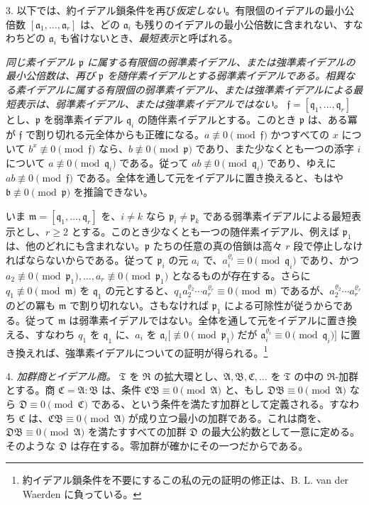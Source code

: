 \documentclass[11pt]{article}
\providecommand{\mR}{\mathfrak{R}}
\providecommand{\mT}{\mathfrak{T}}
\providecommand{\mA}{\mathfrak{A}}
\providecommand{\mB}{\mathfrak{B}}
\providecommand{\mC}{\mathfrak{C}}
\providecommand{\mD}{\mathfrak{D}}
\providecommand{\ma}{\mathfrak{a}}
\providecommand{\mb}{\mathfrak{b}}
\providecommand{\mf}{\mathfrak{f}}
\providecommand{\mm}{\mathfrak{m}}
\providecommand{\mpideal}{\mathfrak{p}}
\providecommand{\mq}{\mathfrak{q}}
\begin{document}
3. 以下では、約イデアル鎖条件を再び\emph{仮定しない}。有限個のイデアルの最小公倍数 $[\ma_1,\ldots,\ma_r]$ は、どの $\ma_i$ も残りのイデアルの最小公倍数に含まれない、すなわちどの $\ma_i$ も省けないとき、\emph{最短表示}と呼ばれる。

\emph{同じ素イデアル $\mpideal$ に属する有限個の弱準素イデアル、または強準素イデアルの最小公倍数は、再び $\mpideal$ を随伴素イデアルとする弱準素イデアルである。相異なる素イデアルに属する有限個の弱準素イデアル、または強準素イデアルによる最短表示は、弱準素イデアル、または強準素イデアルではない。} $\mf=[\mq_1,\ldots,\mq_r]$ とし、$\mpideal$ を弱準素イデアル $\mq_i$ の随伴素イデアルとする。このとき $\mpideal$ は、ある冪が $\mf$ で割り切れる元全体からも正確になる。$a\not\equiv0\pmod{\mf}$ かつすべての $x$ について $b^x\not\equiv0\pmod{\mf}$ なら、$b\not\equiv0\pmod{\mpideal}$ であり、また少なくとも一つの添字 $i$ について $a\not\equiv0\pmod{\mq_i}$ である。従って $ab\not\equiv0\pmod{\mq_i}$ であり、ゆえに $ab\not\equiv0\pmod{\mf}$ である。全体を通して元をイデアルに置き換えると、もはや $\mb\not\equiv0\pmod{\mpideal}$ を推論できない。

いま $\mm=[\mq_1,\ldots,\mq_r]$ を、$i\ne k$ なら $\mpideal_i\ne\mpideal_k$ である弱準素イデアルによる最短表示とし、$r\ge2$ とする。このとき少なくとも一つの随伴素イデアル、例えば $\mpideal_1$ は、他のどれにも含まれない。$\mpideal$ たちの任意の真の倍鎖は高々 $r$ 段で停止しなければならないからである。従って $\mpideal_i$ の元 $a_i$ で、$a_i^{\varrho_i}\equiv0\pmod{\mq_i}$ であり、かつ $a_2\not\equiv0\pmod{\mpideal_1},\ldots,a_r\not\equiv0\pmod{\mpideal_1}$ となるものが存在する。さらに $q_1\not\equiv0\pmod{\mm}$ を $\mq_1$ の元とすると、$q_1a_2^{\varrho_2}\cdots a_r^{\varrho_r}\equiv0\pmod{\mm}$ であるが、$a_2^{\varrho_2}\cdots a_r^{\varrho_r}$ のどの冪も $\mm$ で割り切れない。さもなければ $\mpideal_1$ による可除性が従うからである。従って $\mm$ は弱準素イデアルではない。全体を通して元をイデアルに置き換える、すなわち $q_1$ を $\mq_1$ に、$a_i$ を $\ma_i[\not\equiv0\pmod{\mpideal_1}$ だが $\ma_i^{\varrho_i}\equiv0\pmod{\mq_i}]$ に置き換えれば、強準素イデアルについての証明が得られる。\footnote{約イデアル鎖条件を不要にするこの私の元の証明の修正は、B. L. van der Waerden に負っている。}

4. \emph{加群商とイデアル商。} $\mT$ を $\mR$ の拡大環とし、$\mA,\mB,\mC,\ldots$ を $\mT$ の中の $\mR$-加群とする。商 $\mC=\mA:\mB$ は、条件 $\mC\mB\equiv0\pmod{\mA}$ と、もし $\mD\mB\equiv0\pmod{\mA}$ なら $\mD\equiv0\pmod{\mC}$ である、という条件を満たす加群として定義される。すなわち $\mC$ は、$\mC\mB\equiv0\pmod{\mA}$ が成り立つ最小の加群である。これは商を、$\mD\mB\equiv0\pmod{\mA}$ を満たすすべての加群 $\mD$ の最大公約数として一意に定める。そのような $\mD$ は存在する。零加群が確かにその一つだからである。
\end{document}
